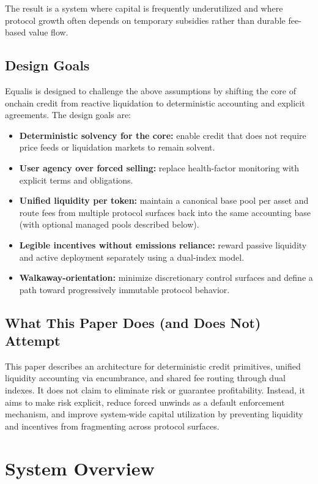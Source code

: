 \documentclass[version=preprint]{iacrcc}
\begin{document}
The result is a system where capital is frequently underutilized and where protocol growth often depends on temporary subsidies rather than durable fee-based value flow.

\subsection{Design Goals}

Equalis is designed to challenge the above assumptions by shifting the core of onchain credit from reactive liquidation to deterministic accounting and explicit agreements. The design goals are:

\begin{itemize}
  \item \textbf{Deterministic solvency for the core:} enable credit that does not require price feeds or liquidation markets to remain solvent.
  \item \textbf{User agency over forced selling:} replace health-factor monitoring with explicit terms and obligations.
  \item \textbf{Unified liquidity per token:} maintain a canonical base pool per asset and route fees from multiple protocol surfaces back into the same accounting base (with optional managed pools described below).
  \item \textbf{Legible incentives without emissions reliance:} reward passive liquidity and active deployment separately using a dual-index model.
  \item \textbf{Walkaway-orientation:} minimize discretionary control surfaces and define a path toward progressively immutable protocol behavior.
\end{itemize}

\subsection{What This Paper Does (and Does Not) Attempt}

This paper describes an architecture for deterministic credit primitives, unified liquidity accounting via encumbrance, and shared fee routing through dual indexes. It does not claim to eliminate risk or guarantee profitability. Instead, it aims to make risk explicit, reduce forced unwinds as a default enforcement mechanism, and improve system-wide capital utilization by preventing liquidity and incentives from fragmenting across protocol surfaces.

\section{System Overview}
\end{document}
